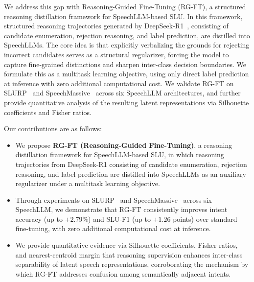 \documentclass[cameraready]{Interspeech}
\begin{document}
We address this gap with Reasoning-Guided Fine-Tuning (RG-FT),
a structured reasoning distillation framework for SpeechLLM-based SLU.
In this framework, structured reasoning trajectories generated by
DeepSeek-R1~\cite{Guo_2025}, consisting of candidate enumeration,
rejection reasoning, and label prediction, are distilled into
SpeechLLMs.
The core idea is that explicitly verbalizing the grounds for rejecting
incorrect candidates serves as a structural regularizer, forcing the
model to capture fine-grained distinctions and sharpen inter-class
decision boundaries.
We formulate this as a multitask learning objective, using only direct
label prediction at inference with zero additional computational cost.
We validate RG-FT on SLURP~\cite{bastianelli-etal-2020-slurp} and
SpeechMassive~\cite{lee2024speechmassivemultilingualspeechdataset} across six SpeechLLM
architectures, and further provide quantitative analysis of the
resulting latent representations via Silhouette coefficients and
Fisher ratios.



Our contributions are as follows:
\begin{itemize}
    \item We propose \textbf{RG-FT (Reasoning-Guided Fine-Tuning)}, a reasoning distillation framework for SpeechLLM-based SLU, in which reasoning trajectories from DeepSeek-R1 consisting of candidate enumeration, rejection reasoning, and label prediction are distilled into SpeechLLMs as an auxiliary regularizer under a multitask learning objective.
    \item Through experiments on SLURP~\cite{bastianelli-etal-2020-slurp} and SpeechMassive~\cite{lee2024speechmassivemultilingualspeechdataset} across six
    SpeechLLM, we demonstrate that RG-FT consistently
    improves intent accuracy (up to $+2.79\%$) and SLU-F1 (up to
    $+1.26$ points) over standard fine-tuning, with zero additional
    computational cost at inference.
    \item We provide quantitative evidence via Silhouette coefficients, Fisher ratios, and nearest-centroid margin that reasoning supervision enhances inter-class separability of latent speech representations, corroborating the mechanism by which RG-FT addresses confusion among semantically adjacent intents.
\end{itemize}





\end{document}

